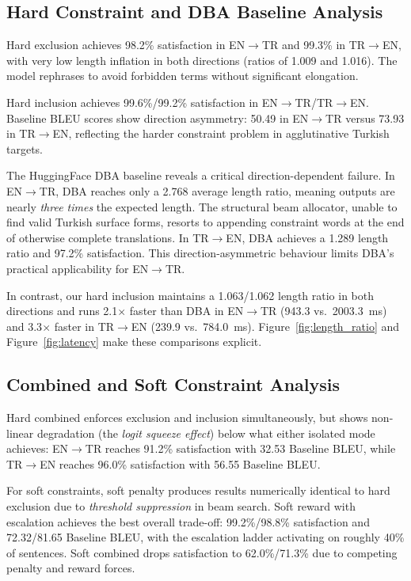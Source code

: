 \documentclass{tlp}
\begin{document}
\subsection{Hard Constraint and DBA Baseline Analysis}

Hard exclusion achieves 98.2\% satisfaction in EN$\rightarrow$TR and 99.3\% in
TR$\rightarrow$EN, with very low length inflation in both directions (ratios of 1.009
and 1.016). The model rephrases to avoid forbidden terms without significant
elongation.

Hard inclusion achieves 99.6\%/99.2\% satisfaction in
EN$\rightarrow$TR/TR$\rightarrow$EN. Baseline BLEU scores show direction asymmetry:
50.49 in EN$\rightarrow$TR versus 73.93 in TR$\rightarrow$EN, reflecting the harder
constraint problem in agglutinative Turkish targets.

The HuggingFace DBA baseline reveals a critical direction-dependent failure. In
EN$\rightarrow$TR, DBA reaches only a 2.768 average length ratio, meaning outputs
are nearly \emph{three times} the expected length. The structural beam allocator,
unable to find valid Turkish surface forms, resorts to appending constraint words at
the end of otherwise complete translations. In TR$\rightarrow$EN, DBA achieves a
1.289 length ratio and 97.2\% satisfaction. This direction-asymmetric behaviour
limits DBA's practical applicability for EN$\rightarrow$TR.

In contrast, our hard inclusion maintains a 1.063/1.062 length ratio in both
directions and runs 2.1$\times$ faster than DBA in EN$\rightarrow$TR (943.3
vs.\ 2003.3~ms) and 3.3$\times$ faster in TR$\rightarrow$EN (239.9 vs.\ 784.0~ms).
Figure~\ref{fig:length_ratio} and Figure~\ref{fig:latency} make these comparisons
explicit.

\subsection{Combined and Soft Constraint Analysis}

Hard combined enforces exclusion and inclusion simultaneously, but shows non-linear
degradation (the \emph{logit squeeze effect}) below what either isolated mode
achieves: EN$\rightarrow$TR reaches 91.2\% satisfaction with 32.53 Baseline BLEU,
while TR$\rightarrow$EN reaches 96.0\% satisfaction with 56.55 Baseline BLEU.

For soft constraints, soft penalty produces results numerically identical to hard
exclusion due to \emph{threshold suppression} in beam search. Soft reward with
escalation achieves the best overall trade-off: 99.2\%/98.8\% satisfaction and
72.32/81.65 Baseline BLEU, with the escalation ladder activating on roughly 40\% of
sentences. Soft combined drops satisfaction to 62.0\%/71.3\% due to competing
penalty and reward forces.
\end{document}
